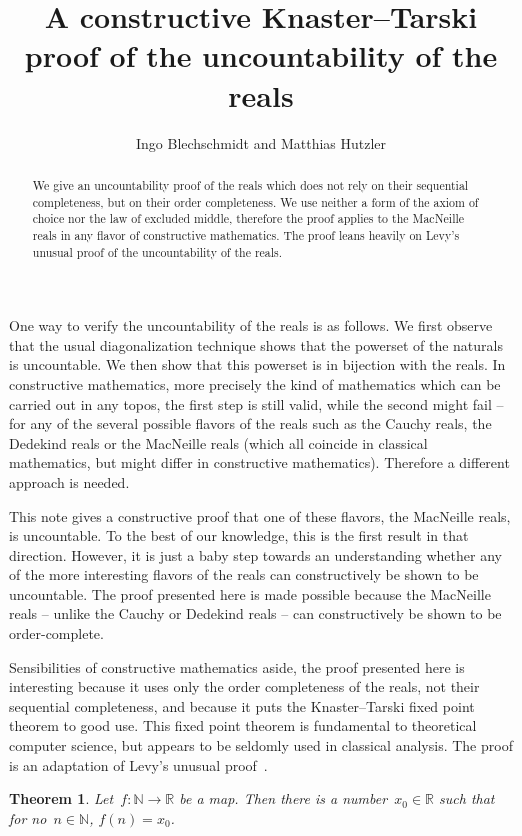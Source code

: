 \documentclass[oneside]{amsart}
\title{A constructive Knaster--Tarski proof of the uncountability of the reals}
\author{Ingo Blechschmidt and Matthias Hutzler}
\newcommand{\NN}{\mathbb{N}}
\newcommand{\RR}{\mathbb{R}}
\theoremstyle{definition}
\theoremstyle{plain}
\newtheorem*{thm*}{Theorem}
\theoremstyle{remark}
\begin{document}
\begin{abstract}
  We give an uncountability proof of the reals which does not rely on their
  sequential completeness, but on their order completeness. We use neither a
  form of the axiom of choice nor the law of excluded middle, therefore
  the proof applies to the MacNeille reals in any flavor of constructive
  mathematics. The proof leans heavily on Levy's unusual proof of the
  uncountability of the reals.
\end{abstract}

\maketitle
\thispagestyle{empty}

One way to verify the uncountability of the reals is as follows. We first
observe that the usual diagonalization technique shows that the powerset of the
naturals is uncountable. We then show that this powerset is in bijection with
the reals. In constructive mathematics, more precisely the kind of mathematics
which can be carried out in any topos, the first step is still valid, while the
second might fail -- for any of the several possible flavors of the reals
such as the Cauchy reals, the Dedekind reals or the MacNeille reals (which all
coincide in classical mathematics, but might differ in constructive
mathematics). Therefore a different approach is needed.

This note gives a constructive proof that one of these flavors,
the MacNeille reals, is uncountable. To the best of our knowledge, this
is the first result in that direction. However, it is just a baby step towards
an understanding whether any of the more interesting flavors of the reals can constructively be
shown to be uncountable. The proof presented here is made possible because the
MacNeille reals -- unlike the Cauchy or Dedekind reals -- can constructively be
shown to be order-complete.

Sensibilities of constructive mathematics aside, the proof presented here is
interesting because it uses only the order completeness of the reals, not their
sequential completeness, and because it puts the Knaster--Tarski fixed point
theorem to good use. This fixed point theorem is fundamental to theoretical
computer science, but appears to be seldomly used in classical analysis.
The proof is an adaptation of Levy's unusual proof~\cite{levy}.

\begin{thm*}Let~$f : \NN \to \RR$ be a map. Then there is a number~$x_0 \in \RR$
such that for no~$n \in \NN$, $f(n) = x_0$.\end{thm*}
\end{document}
